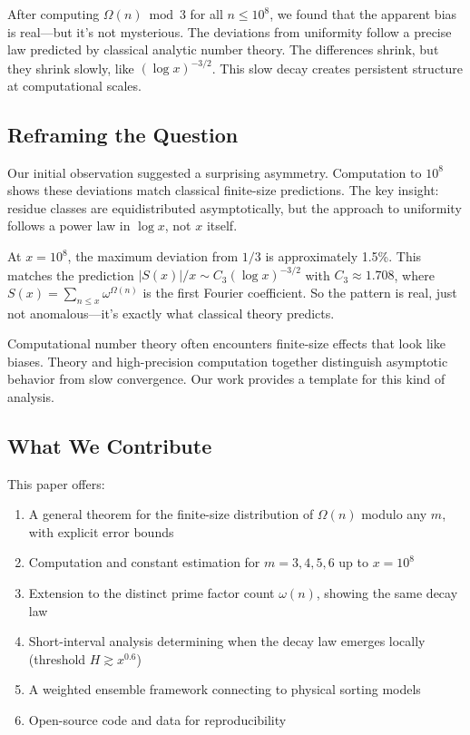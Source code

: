 \documentclass[12pt]{article}
\theoremstyle{definition}
\theoremstyle{remark}
\begin{document}
After computing $\Omega(n) \bmod 3$ for all $n \leq 10^8$, we found that the apparent bias is real—but it's not mysterious. The deviations from uniformity follow a precise law predicted by classical analytic number theory. The differences shrink, but they shrink slowly, like $(\log x)^{-3/2}$. This slow decay creates persistent structure at computational scales.

\subsection{Reframing the Question}

Our initial observation suggested a surprising asymmetry. Computation to $10^8$ shows these deviations match classical finite-size predictions. The key insight: residue classes are equidistributed asymptotically, but the approach to uniformity follows a power law in $\log x$, not $x$ itself.

At $x = 10^8$, the maximum deviation from $1/3$ is approximately 1.5\%. This matches the prediction $|S(x)|/x \sim C_3 (\log x)^{-3/2}$ with $C_3 \approx 1.708$, where $S(x) = \sum_{n \leq x} \omega^{\Omega(n)}$ is the first Fourier coefficient. So the pattern is real, just not anomalous—it's exactly what classical theory predicts.

Computational number theory often encounters finite-size effects that look like biases. Theory and high-precision computation together distinguish asymptotic behavior from slow convergence. Our work provides a template for this kind of analysis.

\subsection{What We Contribute}

This paper offers:
\begin{enumerate}
\item A general theorem for the finite-size distribution of $\Omega(n)$ modulo any $m$, with explicit error bounds
\item Computation and constant estimation for $m = 3, 4, 5, 6$ up to $x = 10^8$
\item Extension to the distinct prime factor count $\omega(n)$, showing the same decay law
\item Short-interval analysis determining when the decay law emerges locally (threshold $H \gtrsim x^{0.6}$)
\item A weighted ensemble framework connecting to physical sorting models
\item Open-source code and data for reproducibility
\end{enumerate}
\end{document}
